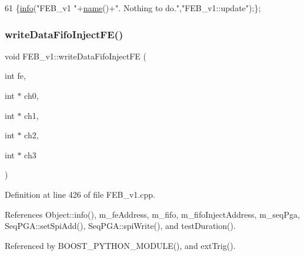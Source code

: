 \begin{DoxyCode}
61 \{\hyperlink{classObject_a644fd329ea4cb85f54fa6846484b84a8}{info}(\textcolor{stringliteral}{"FEB\_v1 "}+\hyperlink{classObject_a300f4c05dd468c7bb8b3c968868443c1}{name}()+\textcolor{stringliteral}{". Nothing to do."},\textcolor{stringliteral}{"FEB\_v1::update"});\};
\end{DoxyCode}
\mbox{\label{classFEB__v1_a0afafcfdea15d3268284203a90c67572}} 
\subsubsection{\texorpdfstring{write\+Data\+Fifo\+Inject\+F\+E()}{writeDataFifoInjectFE()}}
{\footnotesize\ttfamily void F\+E\+B\+\_\+v1\+::write\+Data\+Fifo\+Inject\+FE (\begin{DoxyParamCaption}\item[{int}]{fe,  }\item[{int $\ast$}]{ch0,  }\item[{int $\ast$}]{ch1,  }\item[{int $\ast$}]{ch2,  }\item[{int $\ast$}]{ch3 }\end{DoxyParamCaption})}



Definition at line 426 of file F\+E\+B\+\_\+v1.\+cpp.



References Object\+::info(), m\+\_\+fe\+Address, m\+\_\+fifo, m\+\_\+fifo\+Inject\+Address, m\+\_\+seq\+Pga, Seq\+P\+G\+A\+::set\+Spi\+Add(), Seq\+P\+G\+A\+::spi\+Write(), and test\+Duration().



Referenced by B\+O\+O\+S\+T\+\_\+\+P\+Y\+T\+H\+O\+N\+\_\+\+M\+O\+D\+U\+L\+E(), and ext\+Trig().


